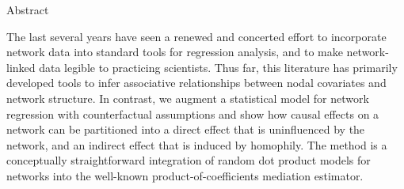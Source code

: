 \documentclass{beamer}
\theoremstyle{remark}
\begin{document}
\begin{frame}{Abstract}

    The last several years have seen a renewed and concerted effort to incorporate network data into standard tools for regression analysis, and to make network-linked data legible to practicing scientists. Thus far, this literature has primarily developed tools to infer associative relationships between nodal covariates and network structure. In contrast, we augment a statistical model for network regression with counterfactual assumptions and show how causal effects on a network can be partitioned into a direct effect that is uninfluenced by the network, and an indirect effect that is induced by homophily. The method is a conceptually straightforward integration of random dot product models for networks into the well-known product-of-coefficients mediation estimator.

\end{frame}



\end{document}

